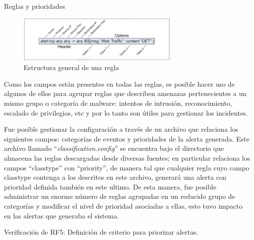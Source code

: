 \begin{section}{Reglas y prioridades}
    \begin{figure}[H]
        \centering
        \includegraphics[width=0.7\textwidth]{./iteracion_3_imagenes/figura_41_estructura_regla.png}
        \caption{Estructura general de una regla}
        \label{fig:figura_41_estruc_regla}
    \end{figure}
    \FloatBarrier
    Como los campos están presentes en todas las reglas, es posible hacer uso de algunos de ellos para agrupar reglas que describen amenazas pertenecientes a un mismo grupo o categoría de malware: intentos de intrusión, reconocimiento, escalado de privilegios, etc y por lo tanto son útiles para gestionar los incidentes. \par
    Fue posible gestionar la configuración a través de un archivo que relaciona los siguientes campos: categorías de eventos y prioridades de la alerta generada. Este archivo llamado “\textit{classification.config}” se encuentra bajo el directorio que almacena las reglas descargadas desde diversas fuentes; en particular relaciona los campos “classtype” con “priority”, de manera tal que cualquier regla cuyo campo classtype contenga a los descritos en este archivo, generará una alerta con prioridad definida también en este ultimo. De esta manera, fue posible administrar un enorme número de reglas agrupadas en un reducido grupo de categorías y modificar el nivel de prioridad asociadas a ellas, esto tuvo impacto en las alertas que generaba el sistema. \par
    
    \begin{section}{Verificación de RF5: Definición de criterio para priorizar alertas.}
    

\end{section}
\end{section}
